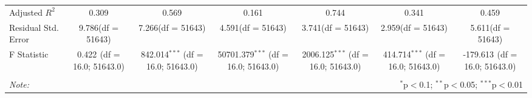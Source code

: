 \begin{table}[!htbp]
\begin{tabular}{@{\extracolsep{5pt}}lcccccc}
 Adjusted $R^2$ & 0.309 & 0.569 & 0.161 & 0.744 & 0.341 & 0.459 \\
 Residual Std. Error & 9.786(df = 51643) & 7.266(df = 51643) & 4.591(df = 51643) & 3.741(df = 51643) & 2.959(df = 51643) & 5.611(df = 51643)  \\
 F Statistic & 0.422$^{}$ (df = 16.0; 51643.0) & 842.014$^{***}$ (df = 16.0; 51643.0) & 50701.379$^{***}$ (df = 16.0; 51643.0) & 2006.125$^{***}$ (df = 16.0; 51643.0) & 414.714$^{***}$ (df = 16.0; 51643.0) & -179.613$^{}$ (df = 16.0; 51643.0) \\
\hline
\hline \\[-1.8ex]
\textit{Note:} & \multicolumn{6}{r}{$^{*}$p$<$0.1; $^{**}$p$<$0.05; $^{***}$p$<$0.01} \\
\end{tabular}
\end{table}